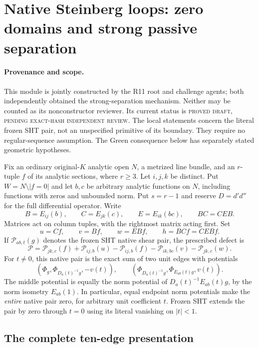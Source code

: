\section{Native Steinberg loops: zero domains and strong passive separation}
\label{sec:r11-challenge-zero-domains}

\paragraph{Provenance and scope.}
This module is jointly constructed by the R11 root and challenge agents;
both independently obtained the strong-separation mechanism.  Neither
may be counted as its nonconstructor reviewer.  Its current status is
\textsc{proved draft, pending exact-hash independent review}.  The local
statements concern the literal frozen SHT pair, not an unspecified
primitive of its boundary.  They require no regular-sequence assumption.
The Green consequence below has separately stated geometric hypotheses.

Fix an ordinary original-$K$ analytic open $N$, a metrized line bundle,
and an $r$-tuple $f$ of its analytic sections, where $r\ge3$.  Let $i,j,k$
be distinct.  Put $W=N\setminus |f=0|$ and let $b,c$ be arbitrary analytic
functions on $N$, including functions with zeros and unbounded norm.
Put $s=r-1$ and reserve $D=d'd''$ for the full differential operator.
Write
\[
 B=E_{ij}(b),\qquad C=E_{jk}(c),\qquad E=E_{ik}(bc),
 \qquad BC=CEB.
 \tag{ZDS1}
\]
Matrices act on column tuples, with the rightmost matrix acting first.
Set
\[
 u=Cf,\qquad v=Bf,\qquad w=EBf,\qquad h=BCf=CEBf.
 \tag{ZDS2}
\]
If $\mathcal P_{ab,t}(g)$ denotes the frozen SHT native shear pair,
the prescribed defect is
\[
 \mathscr P=
 \mathcal P_{jk,c}(f)+\mathcal P_{ij,b}(u)
 -\mathcal P_{ij,b}(f)-\mathcal P_{ik,bc}(v)
 -\mathcal P_{jk,c}(w).
 \tag{ZDS3}
\]
For $t\ne0$, this native pair is the exact sum of two unit edges
with potentials
\[
 (\Phi_g,\Phi_{D_a(t)^{-1}g},-v(t)),\qquad
 (\Phi_{D_a(t)^{-1}g},\Phi_{E_{ab}(t)g},v(t)).
 \tag{ZDS4}
\]
The middle potential is equally the norm potential of
$D_a(t)^{-1}E_{ab}(t)g$, by the norm isometry $E_{ab}(1)$.
In particular, equal endpoint norm potentials make the \emph{entire}
native pair zero, for arbitrary unit coefficient $t$.  Frozen SHT
extends the pair by zero through $t=0$ using its literal vanishing on
$|t|<1$.

\subsection{The complete ten-edge presentation}


